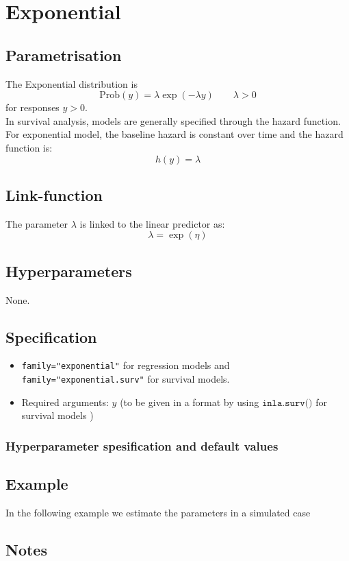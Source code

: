 \documentclass[a4paper,11pt]{article}
\begin{document}
\section*{Exponential}

\subsection*{Parametrisation}

The Exponential distribution is
\begin{displaymath}
    \text{Prob}(y) = \lambda \exp(-\lambda y)\qquad \lambda > 0
\end{displaymath}
for responses $y>0$.\\
In survival analysis, models are generally specified through the
hazard function. For exponential model, the baseline hazard is
constant over time and the hazard function is:
\begin{displaymath}
    h(y)  = \lambda
\end{displaymath}

\subsection*{Link-function}
The parameter $\lambda$ is linked to the linear predictor as:
\[
\lambda = \exp(\eta)
\]

\subsection*{Hyperparameters}

None.

\subsection*{Specification}

\begin{itemize}
\item \texttt{family="exponential"} for regression models and
    \texttt{family="exponential.surv"} for survival models.
\item Required arguments: $y$ (to be given in a format by using
    $\texttt{inla.surv()}$ for survival models )
\end{itemize}

\subsubsection*{Hyperparameter spesification and default values}



\subsection*{Example}

In the following example we estimate the parameters in a simulated
case%


\subsection*{Notes}
\end{document}
